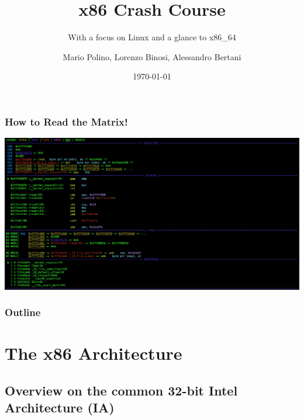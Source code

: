 \documentclass[]{beamer}
\title{x86 Crash Course}
\subtitle{With a focus on Linux and a glance to x86\_64}
\author[NECSTLab]{Mario Polino, Lorenzo Binosi, Alessandro Bertani}
\institute{DEIB, Politecnico di Milano}
\date{\today}
\begin{document}
\begin{frame}
	\titlepage
\end{frame}



\begin{frame}
	\frametitle{How to Read the Matrix!}
  \hspace*{-11mm}
  \includegraphics[width=\paperwidth]{./images/pwndbg.png}
\end{frame}
\begin{frame}
  \frametitle{Outline}
  \tableofcontents
\end{frame}

\section{The x86 Architecture}
\subsection{Overview on the common 32-bit Intel Architecture (IA)}
\end{document}
